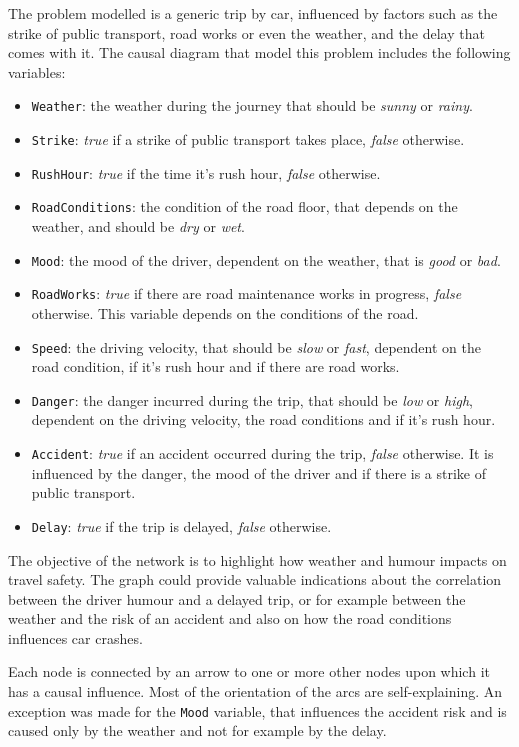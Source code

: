 \documentclass[a4paper,12pt]{article} %
\begin{document}
The problem modelled is a generic trip by car, influenced by factors such as the strike of public transport, road works or even the weather, and the delay that comes with it. 
The causal diagram that model this problem includes the following variables:
\begin{itemize}
	\item \texttt{Weather}: the weather during the journey that should be \textit{sunny} or \textit{rainy}.
	\item \texttt{Strike}: \textit{true} if a strike of public transport takes place, \textit{false} otherwise.
	\item \texttt{RushHour}: \textit{true} if the time it’s rush hour, \textit{false} otherwise.
	\item \texttt{RoadConditions}: the condition of the road floor, that depends on the weather, and should be \textit{dry} or \textit{wet}.
	\item \texttt{Mood}: the mood of the driver, dependent on the weather, that is \textit{good} or \textit{bad}.
	\item \texttt{RoadWorks}: \textit{true} if there are road maintenance works in progress, \textit{false} otherwise. This variable depends on the conditions of the road.
	\item \texttt{Speed}: the driving velocity, that should be \textit{slow} or \textit{fast}, dependent on the road condition, if it’s rush hour and if there are road works.
	\item \texttt{Danger}: the danger incurred during the trip, that should be \textit{low} or \textit{high}, dependent on the driving velocity, the road conditions and if it’s rush hour. %
	\item \texttt{Accident}: \textit{true} if an accident occurred during the trip, \textit{false} otherwise. It is influenced by the danger, the mood of the driver and if there is a strike of public transport.
	\item \texttt{Delay}: \textit{true} if the trip is delayed, \textit{false} otherwise.
\end{itemize}

The objective of the network is to highlight how weather and humour impacts on travel safety. 
The graph could provide valuable indications about the correlation between the driver humour and a delayed trip, or for example between the weather and the risk of an accident and also on how the road conditions influences car crashes.

Each node is connected by an arrow to one or more other nodes upon which it has a causal influence. Most of the orientation of the arcs are self-explaining. An exception was made for the \texttt{Mood} variable, that influences the accident risk and is caused only by the weather and not for example by the delay. 
\end{document}
